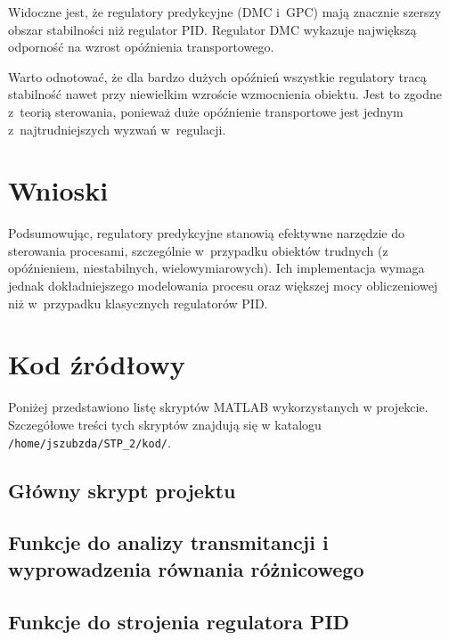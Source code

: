 \documentclass[a4paper,titlepage,11pt,floatssmall]{mwrep}
\begin{document}
Widoczne jest, że regulatory predykcyjne (DMC i~GPC) mają znacznie szerszy obszar stabilności niż regulator PID. Regulator DMC wykazuje największą odporność na wzrost opóźnienia transportowego.

Warto odnotować, że dla bardzo dużych opóźnień wszystkie regulatory tracą stabilność nawet przy niewielkim wzroście wzmocnienia obiektu. Jest to zgodne z~teorią sterowania, ponieważ duże opóźnienie transportowe jest jednym z~najtrudniejszych wyzwań w~regulacji.

\chapter{Wnioski}

Podsumowując, regulatory predykcyjne stanowią efektywne narzędzie do sterowania procesami, szczególnie w~przypadku obiektów trudnych (z opóźnieniem, niestabilnych, wielowymiarowych). Ich implementacja wymaga jednak dokładniejszego modelowania procesu oraz większej mocy obliczeniowej niż w~przypadku klasycznych regulatorów PID.

\chapter{Kod źródłowy}

Poniżej przedstawiono listę skryptów MATLAB wykorzystanych w projekcie. Szczegółowe treści tych skryptów znajdują się w katalogu \texttt{/home/jszubzda/STP\_2/kod/}.

\section{Główny skrypt projektu}



\section{Funkcje do analizy transmitancji i wyprowadzenia równania różnicowego}





\section{Funkcje do strojenia regulatora PID}
\end{document}
